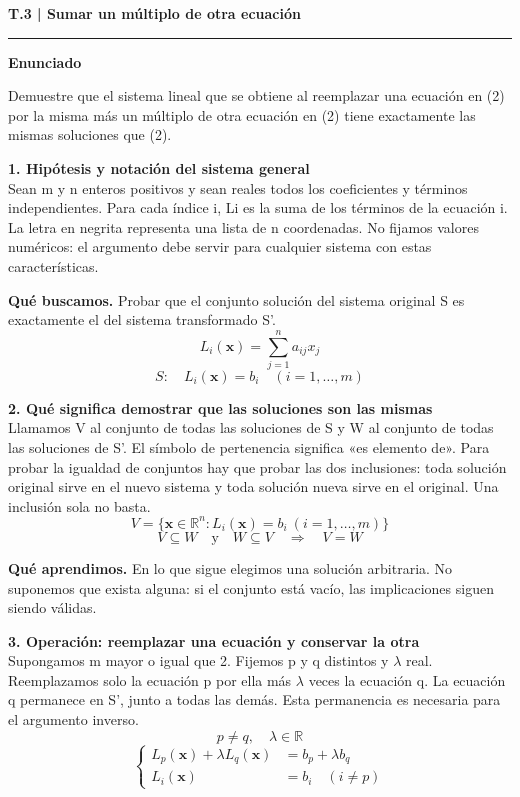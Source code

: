 \documentclass[11pt,a4paper,landscape]{article}
\newcommand{\titulo}[1]{{\LARGE\bfseries #1}\par\smallskip\hrule\medskip}
\begin{document}
\normalsize
\newpage{}\hypertarget{1.1-T.3}{}
\titulo{T.3 | Sumar un múltiplo de otra ecuación}
\textbf{Enunciado}\par Demuestre que el sistema lineal que se obtiene al reemplazar una ecuación en (2) por la misma más un múltiplo de otra ecuación en (2) tiene exactamente las mismas soluciones que (2).
\par\medskip\large
\noindent\begin{minipage}{\linewidth}\textbf{1. Hipótesis y notación del sistema general}\\[2pt]Sean m y n enteros positivos y sean reales todos los coeficientes y términos independientes. Para cada índice i, Li es la suma de los términos de la ecuación i. La letra en negrita representa una lista de n coordenadas. No fijamos valores numéricos: el argumento debe servir para cualquier sistema con estas características.
\par\smallskip\textbf{Qué buscamos.} Probar que el conjunto solución del sistema original S es exactamente el del sistema transformado S'.
\[L_i(\mathbf{x})=\sum_{j=1}^{n}a_{ij}x_j\]
\[S:\quad L_i(\mathbf{x})=b_i\quad (i=1,\ldots,m)\]
\end{minipage}\par\medskip
\noindent\begin{minipage}{\linewidth}\textbf{2. Qué significa demostrar que las soluciones son las mismas}\\[2pt]Llamamos V al conjunto de todas las soluciones de S y W al conjunto de todas las soluciones de S'. El símbolo de pertenencia significa «es elemento de». Para probar la igualdad de conjuntos hay que probar las dos inclusiones: toda solución original sirve en el nuevo sistema y toda solución nueva sirve en el original. Una inclusión sola no basta.
\[V=\{\mathbf{x}\in\mathbb{R}^{n}:L_i(\mathbf{x})=b_i\ (i=1,\ldots,m)\}\]
\[V\subseteq W\quad\mathrm{y}\quad W\subseteq V\quad\Longrightarrow\quad V=W\]
\par\smallskip\textbf{Qué aprendimos.} En lo que sigue elegimos una solución arbitraria. No suponemos que exista alguna: si el conjunto está vacío, las implicaciones siguen siendo válidas.
\end{minipage}\par\medskip
\noindent\begin{minipage}{\linewidth}\textbf{3. Operación: reemplazar una ecuación y conservar la otra}\\[2pt]Supongamos m mayor o igual que 2. Fijemos p y q distintos y $\lambda$ real. Reemplazamos solo la ecuación p por ella más $\lambda$ veces la ecuación q. La ecuación q permanece en S', junto a todas las demás. Esta permanencia es necesaria para el argumento inverso.
\[p\ne q,\quad\lambda\in\mathbb{R}\]
\[\left\{\begin{aligned}L_p(\mathbf{x})+\lambda L_q(\mathbf{x})&=b_p+\lambda b_q\\L_i(\mathbf{x})&=b_i\quad(i\ne p)\end{aligned}\right.\]
\end{minipage}\par\medskip
\end{document}
